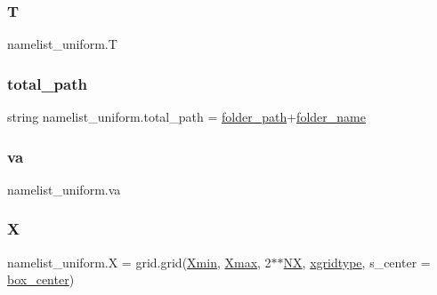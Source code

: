\mbox{\label{namespacenamelist__uniform_a6a573063926a6f17cbb2b3a31c43d4b9}} 
\subsubsection{\texorpdfstring{T}{T}}
{\footnotesize\ttfamily namelist\+\_\+uniform.\+T}

\mbox{\label{namespacenamelist__uniform_a2e5ca55a46dfdae14714d691ada366aa}} 
\subsubsection{\texorpdfstring{total\+\_\+path}{total\_path}}
{\footnotesize\ttfamily string namelist\+\_\+uniform.\+total\+\_\+path = \hyperlink{namespacenamelist__uniform_af7194a37a135451faa53df07d5d52c38}{folder\+\_\+path}+\hyperlink{namespacenamelist__uniform_a7e0c8639f67e462bf0f0ba9874d6965b}{folder\+\_\+name}}

\mbox{\label{namespacenamelist__uniform_a2da183365c60c169afce9cf3b47d7d9b}} 
\subsubsection{\texorpdfstring{va}{va}}
{\footnotesize\ttfamily namelist\+\_\+uniform.\+va}

\mbox{\label{namespacenamelist__uniform_ac57abe57ed039db9d3b98a9a732ae972}} 
\subsubsection{\texorpdfstring{X}{X}}
{\footnotesize\ttfamily namelist\+\_\+uniform.\+X = grid.\+grid(\hyperlink{namespacenamelist__uniform_a7c7288ff312320da0dc2935e7c21279b}{Xmin}, \hyperlink{namespacenamelist__uniform_a5a929208e654614b50cd847076017faf}{Xmax}, 2$\ast$$\ast$\hyperlink{namespacenamelist__uniform_acac19d7f367bfd5436353d2252c045cc}{NX}, \hyperlink{namespacenamelist__uniform_a1bc8692763d4f8bb07a80e0724b8add8}{xgridtype}, s\+\_\+center = \hyperlink{namespacenamelist__uniform_a81530466fd9deb997c3202e5c8325938}{box\+\_\+center})}

